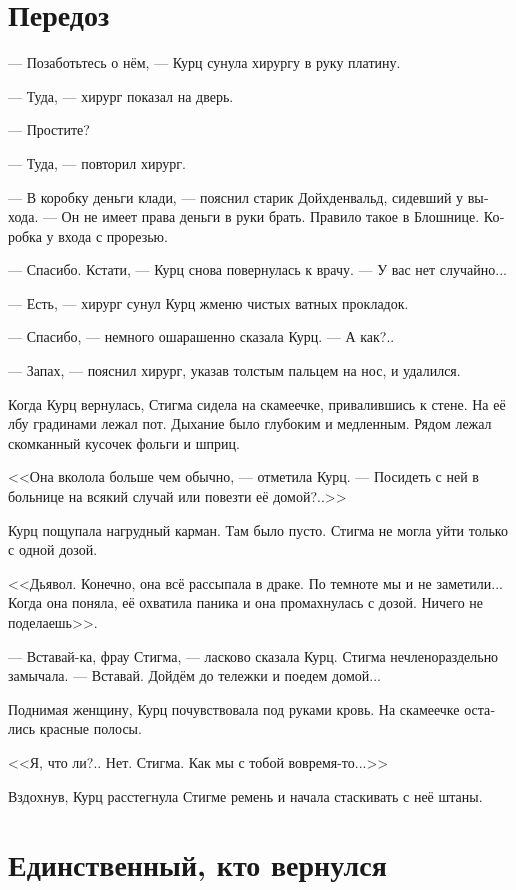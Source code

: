 \documentclass[a4paper,12pt,fleqn]{book}\usepackage{cooltooltips}\usepackage{polyglossia}\setdefaultlanguage[babelshorthands=true]{russian}\setotherlanguage{english}\defaultfontfeatures{Ligatures=TeX,Mapping=tex-text} \usepackage{xcolor}\definecolor{lightgray}{HTML}{bbbbbb}\color{lightgray}\newcommand{\ml}[3]{\textenglish{\textcolor{black}{#3}}}
\begin{document}
\section{Передоз}

--- Позаботьтесь о нём, --- Курц сунула хирургу в руку платину.

--- Туда, --- хирург показал на дверь.

--- Простите?

--- Туда, --- повторил хирург.

--- В коробку деньги клади, --- пояснил старик Дойхденвальд, сидевший у выхода.
--- Он не имеет права деньги в руки брать.
Правило такое в Блошнице.
Коробка у входа с прорезью.

--- Спасибо.
Кстати, --- Курц снова повернулась к врачу.
--- У вас нет случайно...

--- Есть, --- хирург сунул Курц жменю чистых ватных прокладок.

--- Спасибо, --- немного ошарашенно сказала Курц.
--- А как?..

--- Запах, --- пояснил хирург, указав толстым пальцем на нос, и удалился.

Когда Курц вернулась, Стигма сидела на скамеечке, привалившись к стене.
На её лбу градинами лежал пот.
Дыхание было глубоким и медленным.
Рядом лежал скомканный кусочек фольги и шприц.

<<Она вколола больше чем обычно, --- отметила Курц.
--- Посидеть с ней в больнице на всякий случай или повезти её домой?..>>

Курц пощупала нагрудный карман.
Там было пусто.
Стигма не могла уйти только с одной дозой.

<<Дьявол.
Конечно, она всё рассыпала в драке.
По темноте мы и не заметили...
Когда она поняла, её охватила паника и она промахнулась с дозой.
Ничего не поделаешь>>.

--- Вставай-ка, фрау Стигма, --- ласково сказала Курц.
Стигма нечленораздельно замычала.
--- Вставай.
Дойдём до тележки и поедем домой...

Поднимая женщину, Курц почувствовала под руками кровь.
На скамеечке остались красные полосы.

<<Я, что ли?..
Нет.
Стигма.
Как мы с тобой вовремя-то...>>

Вздохнув, Курц расстегнула Стигме ремень и начала стаскивать с неё штаны.

\section{Единственный, кто вернулся}
\end{document}
